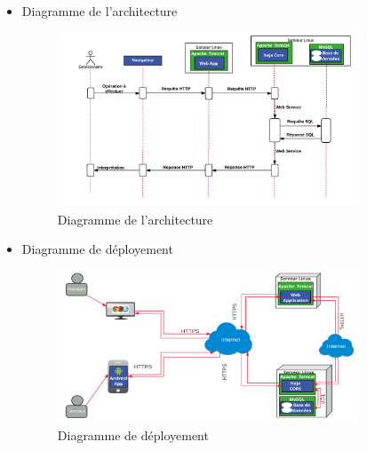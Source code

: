 \documentclass[xcolor=dvipsnames]{beamer}
\begin{document}
  \begin{frame}
  \begin{itemize}
    \item Diagramme de l'architecture
    
    \begin{center}
      \begin{figure}[H]
	\includegraphics[scale=0.3, width=9cm]{images/diagramArchitecture.png}
	\caption{Diagramme de l'architecture}
      \end{figure} 
    \end{center}
  \end{itemize}
  \end{frame}
  
  \begin{frame}
  \begin{itemize}
    \item Diagramme de déployement
    
    \begin{center}
      \begin{figure}[H]
	\includegraphics[scale=0.3, width=9cm]{images/diagrammeDeployement.png}
	\caption{Diagramme de déployement}
      \end{figure} 
    \end{center}
  \end{itemize}
  \end{frame}
\end{document}
